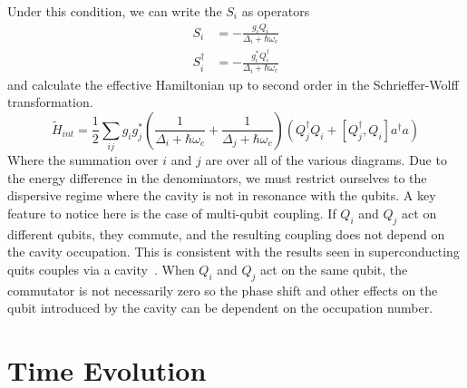 \documentclass[11pt]{article}
\theoremstyle{definition}
\newcommand{\commute}[2]{\left[#1,#2\right]}
\begin{document}
Under this condition, we can write the $S_i$ as operators
\begin{align}
    S_i         & = -\frac{g_iQ_i}{\Delta_i+\hbar\omega_c}           \\
    S_i^\dagger & = -\frac{g_i^*Q_i^\dagger}{\Delta_i+\hbar\omega_c}
\end{align}
and calculate the effective Hamiltonian up to second order in the Schrieffer-Wolff transformation.
\begin{equation}
    \tilde{H}_{int} = \frac{1}{2}\sum_{ij}g_ig_j^*\left(\frac{1}{\Delta_i+\hbar\omega_c}+\frac{1}{\Delta_j+\hbar\omega_c}\right)\left(Q_j^\dagger Q_i + \commute{Q_j^\dagger}{Q_i}a^\dagger a\right)
\end{equation}
Where the summation over $i$ and $j$ are over all of the various diagrams.
Due to the energy difference in the denominators, we must restrict ourselves to the dispersive regime where the cavity is not in resonance with the qubits.
A key feature to notice here is the case of multi-qubit coupling.
If $Q_i$ and $Q_j$ act on different qubits, they commute, and the resulting coupling does not depend on the cavity occupation.
This is consistent with the results seen in superconducting quits couples via a cavity~\cite{majer_2007}.
When $Q_i$ and $Q_j$ act on the same qubit, the commutator is not necessarily zero so the phase shift and other effects on the qubit introduced by the cavity can be dependent on the occupation number.

\section{Time Evolution}

\nocite{*}


\end{document}
